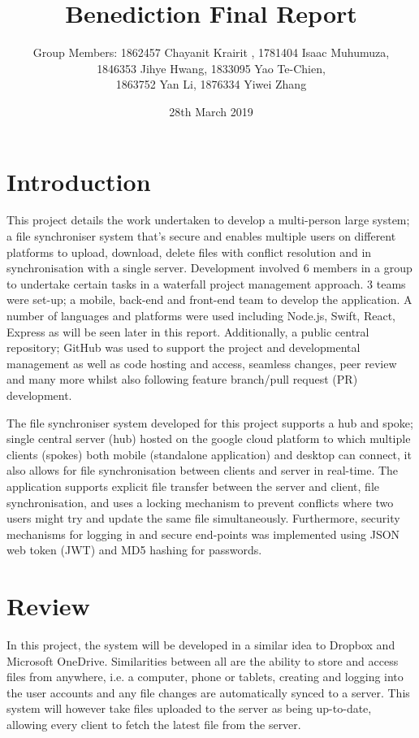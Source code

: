 \documentclass{article}
\title{Benediction Final Report}
\author{Group Members: 1862457 Chayanit Krairit , 1781404 Isaac Muhumuza,\\ 1846353 Jihye Hwang, 1833095 Yao Te-Chien, \\1863752 Yan Li, 1876334 Yiwei Zhang}
\date{28th March 2019}
\begin{document}
\maketitle

\section{Introduction}
This project details the work undertaken to develop a multi-person large system; a file synchroniser system that's secure and enables multiple users on different platforms to upload, download, delete files with conflict resolution and in synchronisation with a single server. Development involved 6 members in a group to undertake certain tasks in a waterfall project management approach. 3 teams were set-up; a mobile, back-end and front-end team to develop the application. A number of languages and platforms were used including Node.js, Swift, React, Express as will be seen later in this report.  
Additionally, a public central repository; GitHub was used to support the project and developmental management as well as code hosting and access, seamless changes, peer review and many more whilst also following feature branch/pull request (PR) development.

The file synchroniser system developed for this project supports a hub and spoke; single central server (hub) hosted on the google cloud platform to which multiple clients (spokes) both mobile (standalone application) and desktop can connect, it also allows for file synchronisation between clients and server in real-time. The application supports explicit file transfer between the server and client, file synchronisation, and uses a locking mechanism to prevent conflicts where two users might try and update the same file simultaneously. Furthermore, security mechanisms for logging in and secure end-points was implemented using JSON web token (JWT) and MD5 hashing for passwords.


\section{Review}
In this project, the system will be developed in a similar idea to Dropbox and Microsoft OneDrive. Similarities between all are the ability to store and access files from anywhere, i.e. a computer, phone or tablets, creating and logging into the user accounts and any file changes are automatically synced to a server. This system will however take files uploaded to the server as being up-to-date, allowing every client to fetch the latest file from the server.
\end{document}

